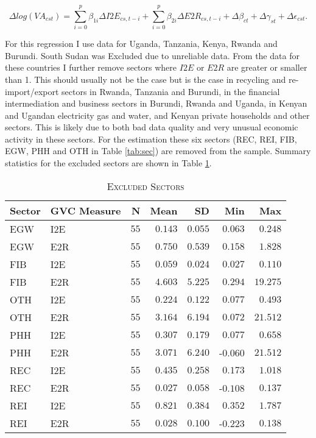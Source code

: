 \documentclass[a4paper]{article}
\begin{document}
\begin{equation} \label{eq:GROWTH_HDFE}
\Delta log(VA_{cst}) = \sum_{i=0}^p \beta_{1i} \Delta I2E_{cs,t-i} + \sum_{i = 0}^p \beta_{2i} \Delta E2R_{cs,t-i}  + \Delta\beta_{ct} + \Delta\gamma_{st} + \Delta\epsilon_{cst}.
\end{equation}

For this regression I use data for Uganda, Tanzania, Kenya, Rwanda and Burundi. South Sudan was Excluded due to unreliable data. From the data for these countries I further remove sectors where $I2E$ or $E2R$ are greater or smaller than 1. This should usually not be the case but is the case in recycling and re-import/export sectors in Rwanda, Tanzania and Burundi, in the financial intermediation and business sectors in Burundi, Rwanda and Uganda, in Kenyan and Ugandan electricity gas and water, and Kenyan private households and other sectors. This is likely due to both bad data quality and very unusual economic activity in these sectors. For the estimation these six sectors (REC, REI, FIB, EGW, PHH and OTH in Table \ref{tab:sec}) are removed from the sample. %
Summary statistics for the excluded sectors are shown in Table \ref{tab:EXCL_SEC}.

\begin{table}[h!] \centering 
  \caption{\label{tab:EXCL_SEC}\textsc{Excluded Sectors}}
  \vspace{2mm}
\begin{tabular}{ llrrrrr} \toprule
Sector & GVC Measure  & N & Mean & SD & Min & Max \\ 
\midrule
EGW & I2E & $55$ & $0.143$ & $0.055$ & $0.063$ & $0.248$ \\ 
EGW & E2R & $55$ & $0.750$ & $0.539$ & $0.158$ & $1.828$ \\ 
FIB & I2E & $55$ & $0.059$ & $0.024$ & $0.027$ & $0.110$ \\ 
FIB & E2R & $55$ & $4.603$ & $5.225$ & $0.294$ & $19.275$ \\ 
OTH & I2E & $55$ & $0.224$ & $0.122$ & $0.077$ & $0.493$ \\ 
OTH & E2R & $55$ & $3.164$ & $6.194$ & $0.072$ & $21.512$ \\ 
PHH & I2E & $55$ & $0.307$ & $0.179$ & $0.077$ & $0.658$ \\ 
PHH & E2R & $55$ & $3.071$ & $6.240$ & -$0.060$ & $21.512$ \\ 
REC & I2E & $55$ & $0.435$ & $0.258$ & $0.173$ & $1.018$ \\ 
REC & E2R & $55$ & $0.027$ & $0.058$ & -$0.108$ & $0.137$ \\ 
REI & I2E & $55$ & $0.821$ & $0.384$ & $0.352$ & $1.787$ \\ 
REI & E2R & $55$ & $0.028$ & $0.100$ & -$0.223$ & $0.138$ \\ \bottomrule
\end{tabular} 
\end{table} 
\end{document}
